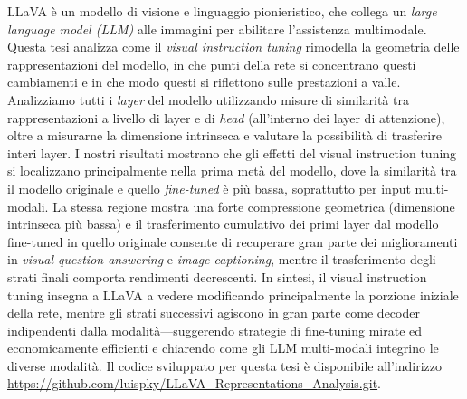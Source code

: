 LLaVA è un modello di visione e linguaggio pionieristico, che collega un \textit{large language model (LLM)} alle immagini per abilitare l'assistenza multimodale. Questa tesi analizza come il \textit{visual instruction tuning} rimodella la geometria delle rappresentazioni del modello, in che punti della rete si concentrano questi cambiamenti e in che modo questi si riflettono sulle prestazioni a valle. Analizziamo tutti i \textit{layer} del modello utilizzando misure di similarità tra rappresentazioni a livello di layer e di \textit{head} (all'interno dei layer di attenzione), oltre a misurarne la dimensione intrinseca e valutare la possibilità di trasferire interi layer. I nostri risultati mostrano che gli effetti del visual instruction tuning si localizzano principalmente nella prima metà del modello, dove la similarità tra il modello originale e quello \textit{fine-tuned} è più bassa, soprattutto per input multi-modali. La stessa regione mostra una forte compressione geometrica (dimensione intrinseca più bassa) e il trasferimento cumulativo dei primi layer dal modello fine-tuned in quello originale consente di recuperare gran parte dei miglioramenti in \textit{visual question answering} e \textit{image captioning}, mentre il trasferimento degli strati finali comporta rendimenti decrescenti. In sintesi, il visual instruction tuning insegna a LLaVA a vedere modificando principalmente la porzione iniziale della rete, mentre gli strati successivi agiscono in gran parte come decoder indipendenti dalla modalità---suggerendo strategie di fine-tuning mirate ed economicamente efficienti e chiarendo come gli LLM multi-modali integrino le diverse modalità. Il codice sviluppato per questa tesi è disponibile all'indirizzo \url{https://github.com/luispky/LLaVA_Representations_Analysis.git}.